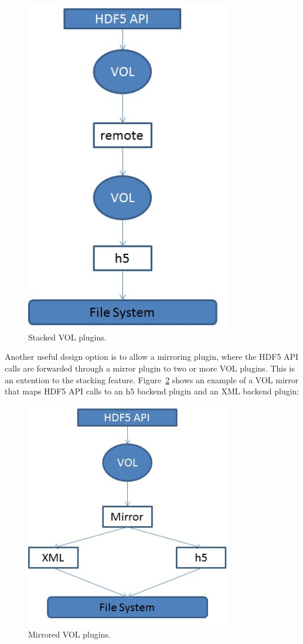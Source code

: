 \documentclass[letterpaper,hyper]{THG_RFC}
\begin{document}
\begin{figure}[h!]
\centering
\includegraphics[width=90mm]{stacked.jpg}
\caption{Stacked VOL plugins.}
\label{fig:stack}
\end{figure}

Another useful design option is to allow a mirroring plugin, where the HDF5 API calls are forwarded through a mirror plugin to two or more VOL plugins. This is an extention to the stacking feature. Figure~\ref{fig:mirror} shows an example of a VOL mirror that maps HDF5 API calls to an h5 backend plugin and an XML backend plugin:

\begin{figure}[h!]
\centering
\includegraphics[width=90mm]{mirrored.jpg}
\caption{Mirrored VOL plugins.}
\label{fig:mirror}
\end{figure}
\end{document}
